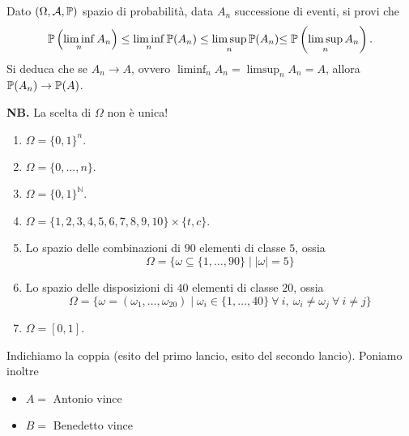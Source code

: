 Dato $( \Omega ,\mathcal{A} ,\P)$ spazio di probabilità, data $A_{n}$ successione di eventi, si provi che
\begin{equation*}
\P\left(\liminf _{n} A_{n}\right) \leq \liminf _{n}\P( A_{n}) \leq \limsup _{n}\P( A_{n})\mathbb{\leq P}\left(\limsup _{n} A_{n}\right) .
\end{equation*}
Si deduca che se $A_{n}\rightarrow A$, ovvero $\liminf\nolimits _{n} A_{n} =\limsup _{n} A_{n} =A$, allora $\P( A_{n})\rightarrow \P( A)$.



\ParteSoluzioni










\Soluzione

\textbf{NB.} La scelta di $\Omega $ non è unica!
\begin{enumerate}
\item $\Omega =\{0,1\}^{n} .$
\item $\Omega =\{0,\dotsc ,n\}$.
\item $\Omega =\{0,1\}^{\mathbb{N}}$.
\item $\Omega =\{1,2,3,4,5,6,7,8,9,10\} \times \{t,c\}$.
\item Lo spazio delle combinazioni di $90$ elementi di classe $5$, ossia\begin{equation*}
\Omega =\{\omega \subseteq \{1,\dotsc ,90\} \mid |\omega |=5\}
\end{equation*}
\item Lo spazio delle disposizioni di $40$ elementi di classe $20$, ossia\begin{equation*}
\Omega =\{\omega =( \omega _{1} ,\dotsc ,\omega _{20}) \mid \omega _{i} \in \{1,\dotsc ,40\} \ \forall \ i,\ \omega _{i} \neq \omega _{j} \ \forall \ i\neq j\}
\end{equation*}
\item $\Omega =[ 0,1]$.
\end{enumerate}
\Soluzione

Indichiamo la coppia (esito del primo lancio, esito del secondo lancio). Poniamo inoltre
\begin{itemize}
\item $A=$ Antonio vince
\item $B=$ Benedetto vince
\end{itemize}

